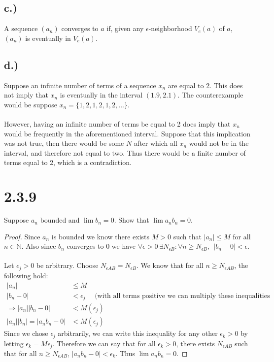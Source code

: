 \documentclass{article}
\begin{document}
	\subsection*{c.)}
		A sequence $(a_n)$ converges to $a$ if, given any $\epsilon$-neighborhood $V_e(a)$ of $a$, $(a_n)$ is eventually in $V_e(a)$.
	\subsection*{d.)}
		Suppose an infinite number of terms of a sequence $x_n$ are equal to 2.
		This does not imply that $x_n$ is eventually in the interval $(1.9, 2.1)$.
		The counterexample would be suppose $x_n = \{ 1, 2, 1, 2, 1, 2, ... \}$. \\\\
		However, having an infinite number of terms be equal to 2 does imply that $x_n$ would be frequently in the aforementioned interval.
		Suppose that this implication was not true, then there would be some $N$ after which all $x_n$ would not be in the interval, and therefore not equal to two.
		Thus there would be a finite number of terms equal to 2, which is a contradiction.

\section*{2.3.9}
	Suppose $a_n$ bounded and $\lim b_n = 0$. Show that $\lim a_n b_n = 0$.
	\begin{proof}
		Since $a_n$ is bounded we know there exists $M > 0$ such that $|a_n| \leqslant M$ for all $n \in \mathbb{N}$.
		Also since $b_n$ converges to 0 we have $\forall \epsilon > 0 \ \exists N_{\epsilon B} : \forall n \geqslant N_{\epsilon B}, \ \ |b_n - 0| < \epsilon$. \\\\
		Let $\epsilon_j > 0$ be arbitrary. Choose $N_{\epsilon A B} = N_{\epsilon B}$.
		We know that for all $n \geqslant N_{\epsilon A B}$, the following hold:
		\begin{align*}
			|a_n| & \leqslant M \\
			|b_n - 0| & < \epsilon_j \ \ \ \ \ \ \text{(with all terms positive we can multiply these inequalities resulting in strict inequality)}\\
			\Longrightarrow |a_n||b_n-0| & < M (\epsilon_j) \\
			|a_n||b_n| = |a_nb_n-0| & < M (\epsilon_j)
		\end{align*}
		Since we chose $\epsilon_j$ arbitrarily, we can write this inequality for any other $\epsilon_k > 0$ by letting $\epsilon_k = M \epsilon_j$.
		Therefore we can say that for all $\epsilon_k > 0$, there exists $N_{\epsilon A B}$ such that for all $n \geqslant N_{\epsilon A B}$, $|a_nb_n-0| < \epsilon_k$.
		Thus $\lim a_n b_n = 0$.

	\end{proof}
\end{document}
